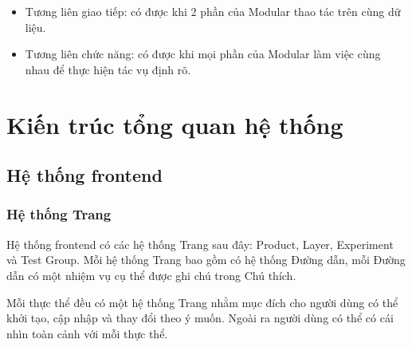 \begin{itemize}
	\item Tương liên giao tiếp: có được khi 2 phần của Modular thao tác trên cùng dữ liệu.
	\item Tương liên chức năng: có được khi mọi phần của Modular làm việc cùng nhau để thực hiện tác vụ định rõ.
\end{itemize}

\section{Kiến trúc tổng quan hệ thống}

\subsection{Hệ thống frontend}

\subsubsection{Hệ thống Trang}

Hệ thống frontend có các hệ thống Trang sau đây: Product, Layer, Experiment và Test Group. Mỗi hệ thống Trang bao gồm có hệ thống Đường dẫn, mỗi Đường dẫn có một nhiệm vụ cụ thể được ghi chú trong Chú thích.

Mỗi thực thể đều có một hệ thống Trang nhằm mục đích cho người dùng có thể khởi tạo, cập nhập và thay đổi theo ý muốn. Ngoài ra người dùng có thể có cái nhìn toàn cảnh với mỗi thực thể.

